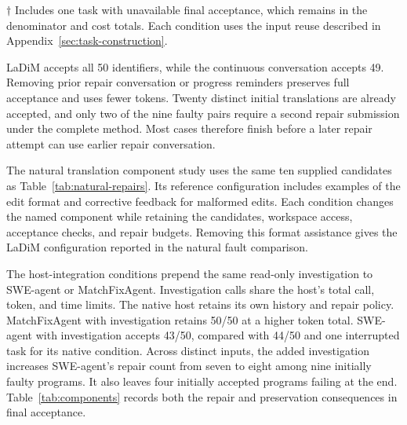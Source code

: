 \begin{table}[!htb]
\caption{Complete component and host-integration comparison on the common MindSpore collection. Token totals include initial translation and all subsequent calls.}
\label{tab:components}
\centering
\small
\setlength{\tabcolsep}{4pt}

\par\vspace{3pt}
\begin{minipage}{\linewidth}
\footnotesize $\dagger$ Includes one task with unavailable final acceptance, which remains in the denominator and cost totals. Each condition uses the input reuse described in Appendix~\ref{sec:task-construction}.
\end{minipage}
\end{table}

LaDiM accepts all 50 identifiers, while the continuous conversation accepts 49. Removing prior repair conversation or progress reminders preserves full acceptance and uses fewer tokens. Twenty distinct initial translations are already accepted, and only two of the nine faulty pairs require a second repair submission under the complete method. Most cases therefore finish before a later repair attempt can use earlier repair conversation.

The natural translation component study uses the same ten supplied candidates as Table~\ref{tab:natural-repairs}. Its reference configuration includes examples of the edit format and corrective feedback for malformed edits. Each condition changes the named component while retaining the candidates, workspace access, acceptance checks, and repair budgets. Removing this format assistance gives the LaDiM configuration reported in the natural fault comparison.

\begin{table}[!htb]
\caption{Effect of repair context and editing assistance on natural translation faults. Tokens cover all ten selected complete runs.}
\label{tab:natural-components}
\centering
\small
\setlength{\tabcolsep}{3pt}

\end{table}


The host-integration conditions prepend the same read-only investigation to SWE-agent or MatchFixAgent. Investigation calls share the host's total call, token, and time limits. The native host retains its own history and repair policy. MatchFixAgent with investigation retains 50/50 at a higher token total. SWE-agent with investigation accepts 43/50, compared with 44/50 and one interrupted task for its native condition. Across distinct inputs, the added investigation increases SWE-agent's repair count from seven to eight among nine initially faulty programs. It also leaves four initially accepted programs failing at the end. Table~\ref{tab:components} records both the repair and preservation consequences in final acceptance.


